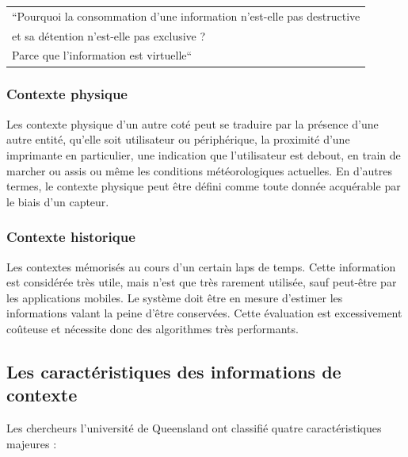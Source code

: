 {%
    \centering
    \begin{tabular}{l}
        ``Pourquoi la consommation d'une information n'est-elle pas destructive
        \\ et sa détention n'est-elle pas exclusive ? \\ 
        Parce que l'information est virtuelle``
        \cite{levy_quest_2010} \\
    \end{tabular}
\par}%

\subsubsection{Contexte physique}

Les contexte physique d'un autre coté peut se traduire par la présence d'une
autre entité, qu'elle soit utilisateur ou périphérique, la proximité d'une
imprimante en particulier, une indication que l'utilisateur est debout, en train
de marcher ou assis ou même les conditions météorologiques actuelles. En d'autres
termes, le contexte physique peut être défini comme toute donnée acquérable par
le biais d'un capteur.

\subsubsection{Contexte historique}

Les contextes mémorisés au cours d'un certain laps de temps. Cette information
est considérée très utile, mais n'est que très rarement utilisée, sauf peut-être
par les applications mobiles. Le système doit être en mesure d'estimer les
informations valant la peine d'être conservées. Cette évaluation est
excessivement coûteuse et nécessite donc des algorithmes très performants.

\subsection{Les caractéristiques des informations de contexte}

Les chercheurs l'université de Queensland ont classifié quatre caractéristiques
majeures : \cite{catharina_context_2002}

